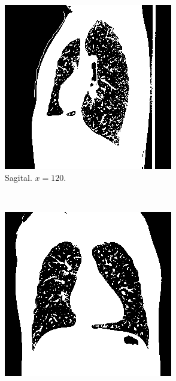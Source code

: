 \documentclass{article}
\begin{document}
\begin{figure}[h]
    \centering
    \begin{subfigure}[b]{0.3\textwidth}
        \includegraphics[width=\textwidth]{thorax/radiologist-sagital-gray.png}
        \caption{Sagital. $x=120$.}
    \end{subfigure}
    ~
    \begin{subfigure}[b]{0.3\textwidth}
        \includegraphics[width=\textwidth]{thorax/radiologist-coronal-gray.png}

\end{subfigure}
\end{figure}
\end{document}
